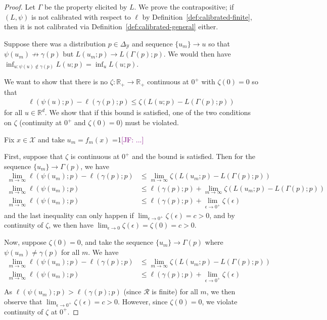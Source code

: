\documentclass{article}
\newcommand{\Comments}{1}
\newcommand{\mynote}[2]{\ifnum\Comments=1\textcolor{#1}{#2}\fi}
\newcommand{\jessie}[1]{\mynote{purple}{[JF: #1]}}
\newcommand{\reals}{\mathbb{R}}
\newcommand{\simplex}{\Delta_\Y}
\newcommand{\R}{\mathcal{R}}
\newcommand{\X}{\mathcal{X}}
\newcommand{\Y}{\mathcal{Y}}
\begin{document}
\begin{proof}
	Let $\Gamma$ be the property elicited by $L$.
	We prove the contrapositive; if $(L, \psi)$ is not calibrated with respect to $\ell$ by Definition~\ref{def:calibrated-finite}, then it is not calibrated via Definition~\ref{def:calibrated-general} either.
	
	Suppose there was a distribution $p \in \simplex$ and sequence $\{u_m\} \to u$ so that $\psi(u_m) \not \to \gamma(p)$ but $L(u_m;p) \to L(\Gamma(p);p)$.
	We would then have $\inf_{u : \psi(u) \not \in \gamma(p)} L(u;p) = \inf_{u} L(u;p)$.
	
	We want to show that there is no $\zeta:\reals_+ \to \reals_+$ continuous at $0^+$ with $\zeta(0) = 0$ so that 
	\begin{align*}
	\ell(\psi(u);p) - \ell(\gamma(p);p) \leq \zeta(L(u;p) - L(\Gamma(p); p))
	\end{align*}
	for all $u \in \reals^d$.
	We show that if this bound is satisfied, one of the two conditions on $\zeta$ (continuity at $0^+$ and $\zeta(0) = 0$) must be violated.
	
	Fix $x \in \X$ and take $u_m = f_m(x)$ \jessie{...}

	
	First, suppose that $\zeta$ is continuous at $0^+$ and the bound is satisfied.
	Then for the sequence $\{u_m\} \to \Gamma(p)$, we have 
	\begin{align*}
	\lim_{m \to \infty}\ell(\psi(u_m); p) - \ell(\gamma(p);p)&\leq \lim_{m \to \infty} \zeta(L(u_m; p) - L(\Gamma(p);p))\\
	\lim_{m \to \infty}\ell(\psi(u_m) ; p) &\leq \ell(\gamma(p);p) + \lim_{m \to \infty} \zeta(L(u_m; p) - L(\Gamma(p);p))\\
	\lim_{m \to \infty}\ell(\psi(u_m) ; p) &\leq \ell(\gamma(p);p) + \lim_{\epsilon \to 0^+} \zeta(\epsilon)
	\end{align*}
	and the last inequality can only happen if $\lim_{\epsilon \to 0^+} \zeta(\epsilon) = c > 0$, and by continuity of $\zeta$, we then have $\lim_{\epsilon \to 0} \zeta(\epsilon) = \zeta(0) = c > 0$. 
	
	Now, suppose $\zeta(0) = 0$, and take the sequence $\{u_m\} \to \Gamma(p)$ where $\psi(u_m) \neq \gamma(p)$ for all $m$.	
	We have 
	\begin{align*}
	\lim_{m \to \infty}\ell(\psi(u_m); p) - \ell(\gamma(p);p)&\leq \lim_{m \to \infty} \zeta(L(u_m; p) - L(\Gamma(p);p))\\
	\lim_{m \to \infty}\ell(\psi(u_m); p) &\leq \ell(\gamma(p);p) +  \lim_{\epsilon \to 0^+} \zeta(\epsilon)\\
	\end{align*}
	As $\ell(\psi(u_m); p)> \ell(\gamma(p); p)$ (since $\R$ is finite) for all $m$, we then observe that $\lim_{\epsilon \to 0^+} \zeta(\epsilon) = c > 0$.
	However, since $\zeta(0) = 0$, we violate continuity of $\zeta$ at $0^+$.
\end{proof}
\end{document}
